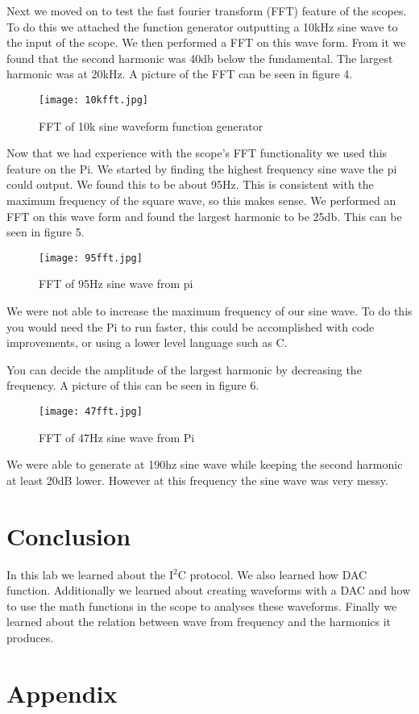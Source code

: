 \documentclass[prl,12pt,notitlepage,aps,onecolumn,superscriptaddress]{revtex4-1}
\begin{document}
Next we moved on to test the fast fourier transform (FFT) feature of the scopes. To do this we attached the function generator outputting a 10kHz sine wave to the input of the scope. We then performed a FFT on this wave form. From it we found that the second harmonic was 40db below the fundamental. The largest harmonic was at 20kHz. A picture of the FFT can be seen in figure 4.

\begin{figure}[h]
\begin{center}
\texttt{[image: 10kfft.jpg]}
\end{center}
\caption{\label{fig:pic} FFT of 10k sine waveform function generator}
\end{figure}

Now that we had experience with the scope's FFT functionality we used this feature on the Pi. We started by finding the highest frequency sine wave the pi could output. We found this to be about 95Hz. This is consistent with the maximum frequency of the square wave, so this makes sense. We performed an FFT on this wave form and found the largest harmonic to be 25db. This can be seen in figure 5.

\begin{figure}[h]
\begin{center}
\texttt{[image: 95fft.jpg]}
\end{center}
\caption{\label{fig:pic} FFT of 95Hz sine wave from pi}
\end{figure}

We were not able to increase the maximum frequency of our sine wave. To do this you would need the Pi to run faster, this could be accomplished with code improvements, or using a lower level language such as C.

You can decide the amplitude of the largest harmonic by decreasing the frequency. A picture of this can be seen in figure 6.

\begin{figure}[h]
\begin{center}
\texttt{[image: 47fft.jpg]}
\end{center}
\caption{\label{fig:pic} FFT of 47Hz sine wave from Pi}
\end{figure}

We were able to generate at 190hz sine wave while keeping the second harmonic at least 20dB lower. However at this frequency the sine wave was very messy.

\section{Conclusion}
In this lab we learned about the I$^2$C protocol. We also learned how DAC function. Additionally we learned about creating waveforms with a DAC and how to use the math functions in the scope to analyses these waveforms. Finally we learned about the relation between wave from frequency and the harmonics it produces.

\section{Appendix}




\end{document}

